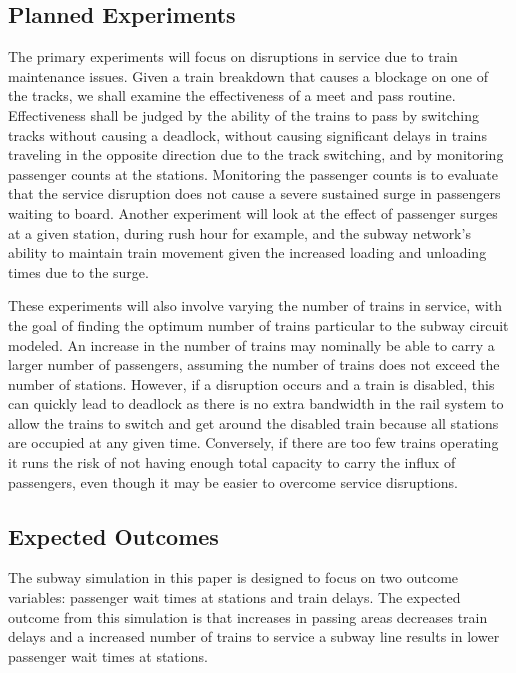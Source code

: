 \subsection{Planned Experiments}
The primary experiments will focus on disruptions in service due to train maintenance issues.  Given a train breakdown that causes a blockage on one of the tracks, we shall examine the effectiveness of a meet and pass routine.  Effectiveness shall be judged by the ability of the trains to pass by switching tracks without causing a deadlock, without causing significant delays in trains traveling in the opposite direction due to the track switching, and by monitoring passenger counts at the stations.  Monitoring the passenger counts is to evaluate that the service disruption does not cause a severe sustained surge in passengers waiting to board.  Another experiment will look at the effect of passenger surges at a given station, during rush hour for example, and the subway network's ability to maintain train movement given the increased loading and unloading times due to the surge. 

These experiments will also involve varying the number of trains in service, with the goal of finding the optimum number of trains particular to the subway circuit modeled.  An increase in the number of trains may nominally be able to carry a larger number of passengers, assuming the number of trains does not exceed the number of stations.  However, if a disruption occurs and a train is disabled, this can quickly lead to deadlock as there is no extra bandwidth in the rail system to allow the trains to switch and get around the disabled train because all stations are occupied at any given time.  Conversely, if there are too few trains operating it runs the risk of not having enough total capacity to carry the influx of passengers, even though it may be easier to overcome service disruptions.

\subsection{Expected Outcomes}

The subway simulation in this paper is designed to focus on two outcome variables: passenger wait times at stations and train delays. The expected outcome from this simulation is that increases in passing areas decreases train delays and a increased number of trains to service a subway line results in lower passenger wait times at stations.